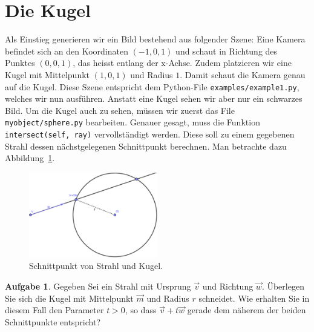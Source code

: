 \documentclass[12pt,a4paper]{article}
\theoremstyle{definition}
\newtheorem{aufgabe}{Aufgabe}
\theoremstyle{definition}
\begin{document}
\section{Die Kugel}
Als Einstieg generieren wir ein Bild bestehend aus folgender Szene:
Eine Kamera befindet sich an den Koordinaten $(-1,0,1)$ und schaut in Richtung des Punktes $(0,0,1)$, das heisst entlang der x-Achse.
Zudem platzieren wir eine Kugel mit Mittelpunkt $(1,0,1)$ und Radius $1$.
Damit schaut die Kamera genau auf die Kugel.
Diese Szene entspricht dem Python-File \texttt{examples/example1.py}, welches wir nun ausführen. Anstatt eine Kugel sehen wir aber nur ein schwarzes Bild.
Um die Kugel auch zu sehen, müssen wir zuerst das File \texttt{myobject/sphere.py} bearbeiten.
Genauer gesagt, muss die Funktion \texttt{intersect(self, ray)} vervollständigt werden.
Diese soll zu einem gegebenen Strahl dessen nächstgelegenen Schnittpunkt berechnen.
Man betrachte dazu Abbildung~\ref{fig:sphere_intersect}.
\begin{figure}[ht]
	\centering
	\includegraphics[width=0.5\textwidth]{images/sphere_intersect.pdf}
	\caption{Schnittpunkt von Strahl und Kugel.}
	\label{fig:sphere_intersect}
\end{figure}
\begin{aufgabe}\label{aufg:intersect_theory}
	Gegeben Sei ein Strahl mit Ursprung $\vec{v}$ und Richtung $\vec{w}$.
	Überlegen Sie sich die Kugel mit Mittelpunkt $\vec{m}$ und Radius $r$ schneidet.
	Wie erhalten Sie in diesem Fall den Parameter $t>0$, so dass $\vec{v}+t\vec{w}$ gerade dem näherem der beiden Schnittpunkte entspricht?
\end{aufgabe}
\end{document}
